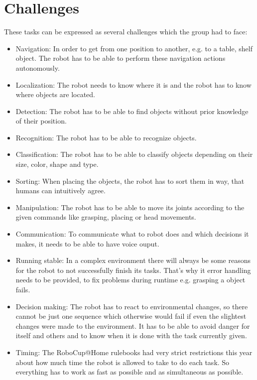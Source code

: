 \documentclass[main.tex]{subfiles}
\begin{document}
	\section{Challenges} 
	These tasks can be expressed as several challenges which the group had to face:
	\begin{itemize}
		\item Navigation: In order to get from one position to another, e.g. to a table, shelf object. The robot has to be able to perform these navigation actions autonomously. 
		\item Localization: The robot needs to know where it is and the robot has to know where objects are located.
		\item Detection: The robot has to be able to find objects without prior knowledge of their position.
		\item Recognition: The robot has to be able to recognize objects.
		\item Classification: The robot has to be able to classify objects depending on their size, color, shape and type.
		\item Sorting: When placing the objects, the robot has to sort them in way, that humans can intuitively agree.
		\item Manipulation: The robot has to be able to move its joints according to the given commands like grasping, placing or head movements.
		\item Communication: To communicate what to robot does and which decisions it makes, it needs to be able to have voice ouput.
		\item Running stable: In a complex environment there will always be some reasons for the robot to not successfully finish its tasks. That's why it error handling needs to be provided, to fix problems during runtime e.g. grasping a object fails.
		\item Decision making: The robot has to react to environmental changes, so there cannot be just one sequence which otherwise would fail if even the slightest changes were made to the environment. It has to be able to avoid danger for itself and others and to know when it is done with the task currently given.
		\item Timing: The RoboCup@Home rulebooks had very strict restrictions this year about how much time the robot is allowed to take to do each task. So everything has to work as fast as possible and as simultaneous as possible.
		
	\end{itemize}
\end{document}
